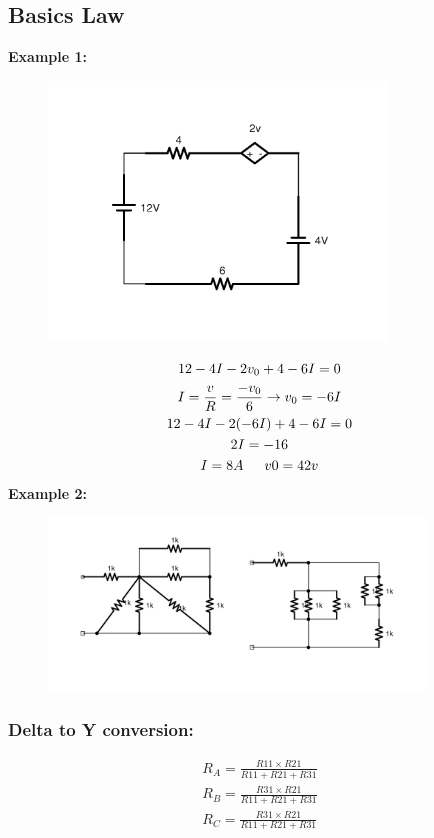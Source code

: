 \documentclass[a4paper,12]{article}
\begin{document}
\subsection{Basics Law}
\textbf{Example 1:}
\begin{figure}[!h]
\centering
	\includegraphics[width=90mm]{Image/IMG_6BA85753A355-1.jpeg}
\end{figure}
\begin{gather}
	12-4I-2v_0+4-6I=0\\
	I=\frac{v}{R}=\frac{-v_0}{6}\rightarrow v_0=-6I\\
	12-4I-2(-6I)+4-6I=0\\
	2I=-16\\
	I=8A  \indent v0=42v
\end{gather}
\textbf{Example 2:}
\begin{figure}[H]
	\centering
	\includegraphics[width=100mm]{Image/IMG_5767AD1A8240-1.jpeg}
\end{figure}

\subsubsection{Delta to Y conversion: }
\begin{gather}
	R_A=\frac{R11\times R21}{R11+R21+R31}\\
	R_B=\frac{R31\times R21}{R11+R21+R31}\\
	R_C=\frac{R31\times R21}{R11+R21+R31}
\end{gather}
	
\end{document}
